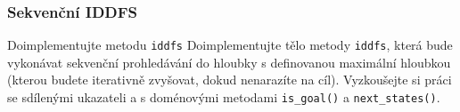\documentclass[usenames,dvipsnames,9pt]{beamer}
\begin{document}
{
\begin{frame}[fragile]
\frametitle{Sekvenční IDDFS}

  \begin{block}{Doimplementujte metodu \texttt{iddfs}}
    Doimplementujte tělo metody \texttt{iddfs}, která bude vykonávat sekvenční prohledávání do hloubky s definovanou maximální hloubkou (kterou budete iterativně zvyšovat, dokud nenarazíte na cíl). Vyzkoušejte si práci se sdílenými ukazateli a s doménovými metodami \texttt{is\_goal()} a \texttt{next\_states()}.
  \end{block}

\end{frame}
}

\framefeedback{}
\end{document}
